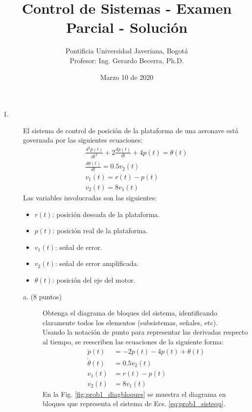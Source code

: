 \documentclass[11pt, spanish]{article}
\title{Control de Sistemas - Examen Parcial - Solución}
\author{Pontificia Universidad Javeriana, Bogotá\\Profesor: Ing. Gerardo Becerra, Ph.D.}
\date{Marzo 10 de 2020}
\begin{document}
	\maketitle
		\begin{description}
			\item [1.] El sistema de control de posición de la plataforma de una aeronave está governada por las siguientes ecuaciones:
			\begin{align}
				\frac{d^2p(t)}{dt^2} + 2 \frac{dp(t)}{dt} + 4p(t) = \theta(t)\\
				\frac{d\theta(t)}{dt} = 0.5v_2(t)\\
				v_1(t) = r(t) - p(t)\\
				v_2(t) = 8v_1(t)
			\end{align}
			Las variables involucradas son las siguientes:
			\begin{itemize}
				\item $r(t)$: posición deseada de la plataforma.
				\item $p(t)$: posición real de la plataforma.
				\item $v_1(t)$: señal de error.
				\item $v_2(t)$: señal de error amplificada.
				\item $\theta(t)$: posición del eje del motor.
			\end{itemize}
			\begin{description}
				\item [a. (8 puntos)] Obtenga el diagrama de bloques del sistema, identificando claramente todos los elementos (subsistemas, señales, etc).\\
				Usando la notación de punto para representar las derivadas respecto al tiempo, se reescriben las ecuaciones de la siguiente forma:
				\begin{subequations}
					\begin{align}
						\ddot{p}(t) &= -2 \dot{p}(t) - 4p(t) + \theta(t)\\
						\dot{\theta}(t) &= 0.5 v_2(t)\\
						v_1(t) &= r(t) - p(t)\\
						v_2(t) &= 8v_1(t)
					\end{align}
					\label{eq:prob1_sistequ}
				\end{subequations}
				En la Fig. \ref{fig:prob1_diagbloques} se muestra el diagrama en bloques que representa el sistema de Ecs. \ref{eq:prob1_sistequ}.
				\begin{figure}

\end{figure}
\end{description}
\end{description}
\end{document}
